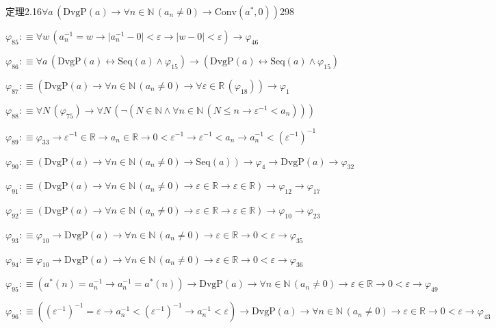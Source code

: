 \begin{fullproof}{定理2.16}{$\forall a\,(\mathrm{DvgP}(a) \to \forall n \in \mathbb{N}\,(a_{n} \neq 0) \to \mathrm{Conv}(a^{\ast},0))$}{298}
\begin{abbrevlist}
\item $\varphi_{85} :\equiv \forall w\,(a_{n}^{-1} = w \to \lvert a_{n}^{-1} - 0 \rvert < \varepsilon \to \lvert w - 0 \rvert < \varepsilon) \to \varphi_{46}$
\item $\varphi_{86} :\equiv \forall a\,(\mathrm{DvgP}(a) \leftrightarrow \mathrm{Seq}(a) \land \varphi_{15}) \to (\mathrm{DvgP}(a) \leftrightarrow \mathrm{Seq}(a) \land \varphi_{15})$
\item $\varphi_{87} :\equiv (\mathrm{DvgP}(a) \to \forall n \in \mathbb{N}\,(a_{n} \neq 0) \to \forall \varepsilon \in \mathbb{R}\,(\varphi_{18})) \to \varphi_{1}$
\item $\varphi_{88} :\equiv \forall N\,(\varphi_{75}) \to \forall N\,(\neg (N \in \mathbb{N} \land \forall n \in \mathbb{N}\,(N \leq n \to \varepsilon^{-1} < a_{n})))$
\item $\varphi_{89} :\equiv \varphi_{33} \to \varepsilon^{-1} \in \mathbb{R} \to a_{n} \in \mathbb{R} \to 0 < \varepsilon^{-1} \to \varepsilon^{-1} < a_{n} \to a_{n}^{-1} < (\varepsilon^{-1})^{-1}$
\item $\varphi_{90} :\equiv (\mathrm{DvgP}(a) \to \forall n \in \mathbb{N}\,(a_{n} \neq 0) \to \mathrm{Seq}(a)) \to \varphi_{4} \to \mathrm{DvgP}(a) \to \varphi_{32}$
\item $\varphi_{91} :\equiv (\mathrm{DvgP}(a) \to \forall n \in \mathbb{N}\,(a_{n} \neq 0) \to \varepsilon \in \mathbb{R} \to \varepsilon \in \mathbb{R}) \to \varphi_{12} \to \varphi_{17}$
\item $\varphi_{92} :\equiv (\mathrm{DvgP}(a) \to \forall n \in \mathbb{N}\,(a_{n} \neq 0) \to \varepsilon \in \mathbb{R} \to \varepsilon \in \mathbb{R}) \to \varphi_{10} \to \varphi_{23}$
\item $\varphi_{93} :\equiv \varphi_{10} \to \mathrm{DvgP}(a) \to \forall n \in \mathbb{N}\,(a_{n} \neq 0) \to \varepsilon \in \mathbb{R} \to 0 < \varepsilon \to \varphi_{35}$
\item $\varphi_{94} :\equiv \varphi_{10} \to \mathrm{DvgP}(a) \to \forall n \in \mathbb{N}\,(a_{n} \neq 0) \to \varepsilon \in \mathbb{R} \to 0 < \varepsilon \to \varphi_{36}$
\item $\varphi_{95} :\equiv (a^{\ast}(n) = a_{n}^{-1} \to a_{n}^{-1} = a^{\ast}(n)) \to \mathrm{DvgP}(a) \to \forall n \in \mathbb{N}\,(a_{n} \neq 0) \to \varepsilon \in \mathbb{R} \to 0 < \varepsilon \to \varphi_{49}$
\item $\varphi_{96} :\equiv ((\varepsilon^{-1})^{-1} = \varepsilon \to a_{n}^{-1} < (\varepsilon^{-1})^{-1} \to a_{n}^{-1} < \varepsilon) \to \mathrm{DvgP}(a) \to \forall n \in \mathbb{N}\,(a_{n} \neq 0) \to \varepsilon \in \mathbb{R} \to 0 < \varepsilon \to \varphi_{43}$

\end{abbrevlist}
\end{fullproof}
